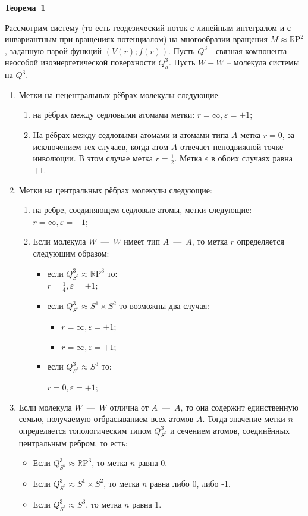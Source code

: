 \textbf{Теорема~1} \par
{Рассмотрим систему (то есть геодезический поток с линейным интегралом и с инвариантным при вращениях потенциалом) на многообразии вращения $M\approx \mathbb{R}\mathrm{P}^2$, заданную парой функций $(V(r);f(r))$.
Пусть $Q^3$ - связная компонента неособой изоэнергетической поверхности $Q^3_{h}$. Пусть $W -W$ -- молекула системы на $Q^3$.
\begin{enumerate}

\item Метки на нецентральных рёбрах молекулы следующие:
\begin{enumerate}
  \item на рёбрах между седловыми атомами метки: $r=\infty, \varepsilon=+1$;
 \item
  На рёбрах между седловыми атомами и атомами типа $A$ метка $r=0$, за исключением тех случаев, когда атом $A$ отвечает неподвижной точке инволюции. В этом случае метка $r=\frac{1}{2}$. Метка $\varepsilon$ в обоих случаях равна $+1$.
\end{enumerate}
\item Метки на центральных рёбрах молекулы следующие:
\begin{enumerate}
  \item
  на ребре, соединяющем седловые атомы, метки следующие: $r=\infty, \varepsilon=-1$;
  \item
  Если молекула $W$~---~$W$ имеет тип $A$~---~$A$, то метка $r$ определяется следующим образом:
  \begin{itemize}
  \item
  если $Q^{3}_{S^2}\approx \mathbb{R}\mathrm{P}^3$ то:
\\
  $r=\frac{1}{4}, \varepsilon=+1$;

\item
если $Q^{3}_{S^2}\approx S^1\times S^2$ то возможны два случая:
  \begin{itemize}
  \item  $r=\infty, \varepsilon=+1$;
  \item $r=\infty, \varepsilon=+1$;
    \end{itemize}
\item
если $Q^{3}_{S^2}\approx S^3$ то:
\par
 $r=0, \varepsilon=+1$;
  \end{itemize}
  \end{enumerate}
\item Если молекула $W$~---~$W$ отлична от $A$~---~$A$, то она содержит единственную семью, получаемую отбрасыванием всех атомов $A$. Тогда значение метки $n$ определяется топологическим типом $Q^{3}_{S^2}$ и сечением атомов, соединённых центральным ребром, то есть:
 \begin{itemize}
  \item Если $Q^{3}_{S^2}\approx \mathbb{R}\mathrm{P}^3$, то метка $n$ равна 0.
  \item Если  $Q^{3}_{S^2}\approx S^1\times S^2$, то метка $n$ равна либо 0, либо -1.
  \item Если  $Q^{3}_{S^2}\approx S^3$, то метка $n$ равна 1.
  \end{itemize}
  \end{enumerate}



}
